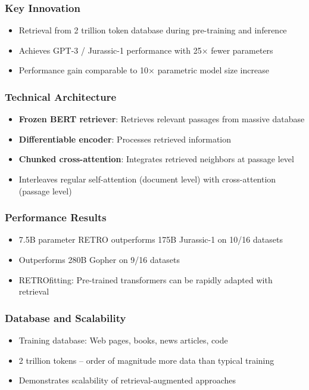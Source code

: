 \documentclass[11pt,letterpaper]{article}
\begin{document}
\subsubsection{Key Innovation}
\begin{itemize}[leftmargin=*]
    \item Retrieval from 2 trillion token database during pre-training and inference
    \item Achieves GPT-3 / Jurassic-1 performance with 25× fewer parameters
    \item Performance gain comparable to 10× parametric model size increase
\end{itemize}

\subsubsection{Technical Architecture}
\begin{itemize}[leftmargin=*]
    \item \textbf{Frozen BERT retriever}: Retrieves relevant passages from massive database
    \item \textbf{Differentiable encoder}: Processes retrieved information
    \item \textbf{Chunked cross-attention}: Integrates retrieved neighbors at passage level
    \item Interleaves regular self-attention (document level) with cross-attention (passage level)
\end{itemize}

\subsubsection{Performance Results}
\begin{itemize}[leftmargin=*]
    \item 7.5B parameter RETRO outperforms 175B Jurassic-1 on 10/16 datasets
    \item Outperforms 280B Gopher on 9/16 datasets
    \item RETROfitting: Pre-trained transformers can be rapidly adapted with retrieval
\end{itemize}

\subsubsection{Database and Scalability}
\begin{itemize}[leftmargin=*]
    \item Training database: Web pages, books, news articles, code
    \item 2 trillion tokens -- order of magnitude more data than typical training
    \item Demonstrates scalability of retrieval-augmented approaches
\end{itemize}
\end{document}
